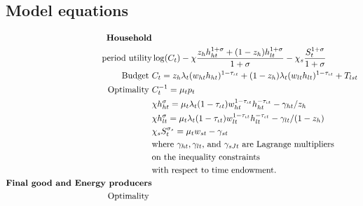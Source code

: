 \subsection{Model equations}
\vspace{-2mm}
\begin{align}
\text{\textbf{Household}}&\nonumber\\ \text{period utility}\vspace{4mm}&  \log(C_t)-\chi\frac{z_hh_{ht}^{1+\sigma}+(1-z_h)h_{lt}^{1+\sigma}}{1+\sigma}-\chi_s\frac{S_t^{1+\sigma}}{{1+\sigma}} \nonumber %
\\
\text{Budget}\ \vspace{4mm}& C_t=z_h \lambda_t (w_{ht}h_{ht})^{1-\tau_{\iota t}}+(1-z_h) \lambda_t (w_{lt}h_{lt})^{1-\tau_{\iota t}}+T_{lst}\nonumber\\ %
\text{Optimality}\ \vspace{4mm}
& C_t^{-1}= \mu_tp_{t}\nonumber\\
& \chi h_{ht}^{\sigma}=\mu_t \lambda_t(1-\tau_{\iota t})w_{ht}^{1-\tau_{\iota t}}h_{ht}^{-\tau_{\iota t}}-\gamma_{ht}/z_h\nonumber\\
& \chi h_{lt}^{\sigma}=\mu_t \lambda_t(1-\tau_{\iota t})w_{lt}^{1-\tau_{\iota t}}h_{lt}^{-\tau_{\iota t}}-\gamma_{lt}/(1-z_h)\nonumber\\
& \chi_s S_{t}^{\sigma_s} =\mu_t w_{st}-\gamma_{st} \nonumber\\ %
& \text{where $\gamma_{ht}, \gamma_{lt}$, and $\gamma_{sJt}$ are Lagrange multipliers}\nonumber \\ 
& \text{on the inequality constraints}\nonumber \\ 
& \text{with respect to time endowment.}\nonumber\\
\text{\textbf{Final good and Energy producers}}&\nonumber\\
\text{Optimality}\ \vspace{4mm}&

\end{align}
